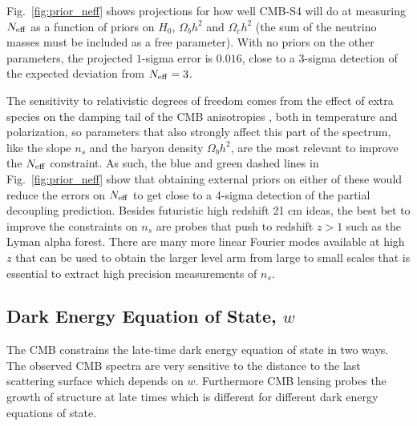 \documentclass[aps,prd,reprint,superscriptaddress,nofootinbib,floatfix]{revtex4-1}
\newcommand{\reffig}[1]{Fig.~\ref{fig:#1}}
\begin{document}
\reffig{prior_neff} shows projections for how well CMB-S4 will do at measuring $N_{\rm eff}$ as a function of priors on $H_{0}$, $\Omega_{b}h^{2}$ and $\Omega_{c}h^{2}$ (the sum of the neutrino masses must be included as a free parameter). With no priors on the other parameters, the projected $1$-sigma error is $0.016$, close to a 3-sigma detection of the expected deviation from $N_{\rm eff}=3$. 

The sensitivity to relativistic degrees of freedom comes from the effect of extra species on the damping tail of the CMB anisotropies \cite{2013PhRvD..87h3008H}, both in temperature and polarization, so parameters that also strongly affect this part of the spectrum, like the slope $n_s$ and the baryon density $\Omega_bh^2$, are the most relevant to improve the $N_{\rm eff}$ constraint. As such, the blue and green dashed lines in \reffig{prior_neff} show that obtaining external priors on either of these would reduce the errors on $N_{\rm eff}$ to get close to a 4-sigma detection of the partial decoupling prediction. Besides futuristic high redshift 21 cm ideas, the best bet to improve the constraints on $n_s$ are probes that push to redshift $z>1$ such as the Lyman alpha forest. There are many more linear Fourier modes available at high $z$ that can be used to obtain the larger level arm from large to small scales that is essential to extract high precision measurements of $n_s$. 

\subsection{Dark Energy Equation of State, $w$}

The CMB constrains the late-time dark energy equation of state in two ways. The observed CMB spectra are very sensitive to the distance to the last scattering surface which depends on $w$. 
Furthermore CMB lensing probes the growth of structure at late times which is different for different dark energy equations of state.
\end{document}
